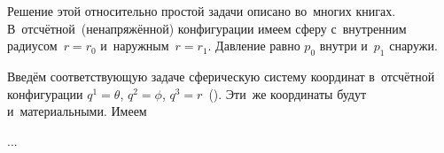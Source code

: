 

\label{para:hollowsphereunderpressure}

\begin{otherlanguage}{russian}

Решение этой относительно простой задачи описано во~многих книгах. В~отсчётной~(ненапряжённой) конфигурации имеем сферу с~внутренним радиусом~${r \!=\! r_0}$ и~наружным~${r \!=\! r_1}$. Давление равно $p_0$ внутри и~$p_1$ снаружи.

Введём соответствующую задаче сферическую систему координат в~отсчётной конфигурации ${q^1 = \theta}$, ${q^2 = \phi}$, ${q^3 = r}$~(). Эти~же координаты будут и~материальными. Имеем

...



\end{otherlanguage}

\newpage



\label{para:stressesAsLagrangeMultipliers}

